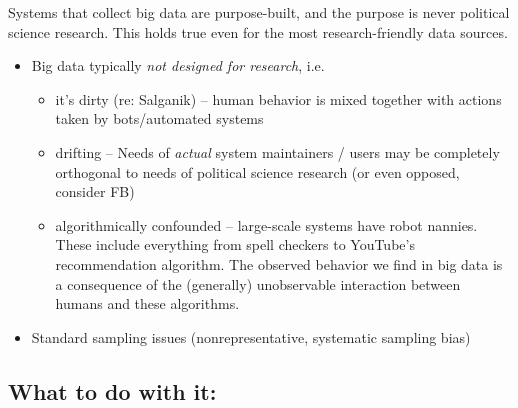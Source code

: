 \documentclass[12pt,]{article}
\providecommand{\tightlist}{%
  \setlength{\itemsep}{0pt}\setlength{\parskip}{0pt}}
\begin{document}
Systems that collect big data are purpose-built, and the purpose is
never political science research. This holds true even for the most
research-friendly data sources.

\begin{itemize}
\tightlist
\item
  Big data typically \emph{not designed for research}, i.e.

  \begin{itemize}
  \tightlist
  \item
    it's dirty (re: Salganik) -- human behavior is mixed together with
    actions taken by bots/automated systems
  \item
    drifting -- Needs of \emph{actual} system maintainers / users may be
    completely orthogonal to needs of political science research (or
    even opposed, consider FB)
  \item
    algorithmically confounded -- large-scale systems have robot
    nannies. These include everything from spell checkers to YouTube's
    recommendation algorithm. The observed behavior we find in big data
    is a consequence of the (generally) unobservable interaction between
    humans and these algorithms.
  \end{itemize}
\item
  Standard sampling issues (nonrepresentative, systematic sampling bias)
\end{itemize}

\hypertarget{what-to-do-with-it}{%
\subsection{What to do with it:}\label{what-to-do-with-it}}
\end{document}
